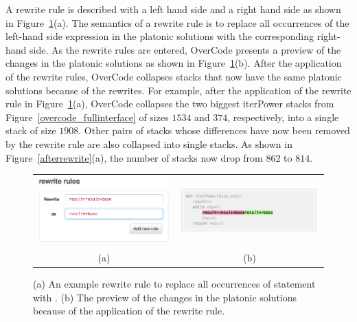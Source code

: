 A rewrite rule is described with a left hand side and a right hand side as shown in Figure~\ref{rewriterule}(a). The semantics of a rewrite rule is to replace all occurrences of the left-hand side expression in the platonic solutions with the corresponding right-hand side. As the rewrite rules are entered, OverCode presents a preview of the changes in the platonic solutions as shown in Figure~\ref{rewriterule}(b). After the application of the rewrite rules, OverCode collapses stacks that now have the same platonic solutions because of the rewrites. For example, after the application of the rewrite rule in Figure~\ref{rewriterule}(a), OverCode collapses the two biggest iterPower stacks from Figure~\ref{overcode_fullinterface} of sizes $1534$ and $374$, respectively, into a single stack of size $1908$. Other pairs of stacks whose differences have now been removed by the rewrite rule are also collapsed into single stacks. As shown in Figure~\ref{afterrewrite}(a), the number of stacks now drop from $862$ to $814$.

\begin{figure}[htpb]
\begin{tabular}{c | c}
\begin{minipage}{.5\linewidth}
\centering
\includegraphics[scale=0.45]{Body/figures/overcode/rewriteRuleScreenshot.png}
\end{minipage}
&
\begin{minipage}{.5\linewidth}
\centering
\includegraphics[scale=0.40]{Body/figures/overcode/rewritePreviewScreenShot.png}
\end{minipage}
\\
(a) & (b)
\end{tabular}
\caption{(a) An example rewrite rule to replace all occurrences of statement  with . (b) The preview of the changes in the platonic solutions because of the application of the rewrite rule.}
\label{rewriterule}
\end{figure}

